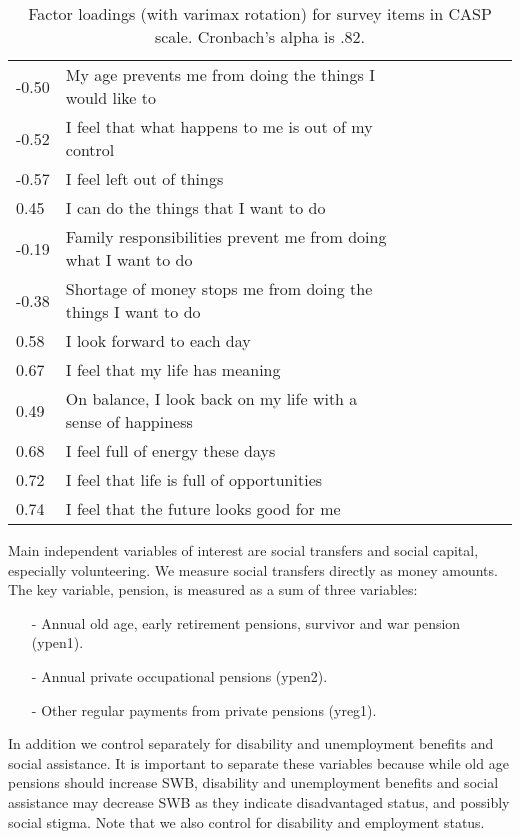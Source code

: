 \documentclass[10pt, letterpaper]{article}
\begin{document}
\begin{spacing}{1.4}
\begin{table}[h!]
  \centering
  \begin{tabular}{lllllllll} %
\hline
  -0.50& My age prevents me from doing the things I would like to\\
  -0.52& I feel that what happens to me is out of my control\\
  -0.57& I feel left out of things\\
   0.45& I can do the things that I want to do\\
  -0.19& Family responsibilities prevent me from doing what I want to do\\
  -0.38& Shortage of money stops me from doing the things I want to do\\
   0.58& I look forward to each day\\
   0.67& I feel that my life has meaning\\
   0.49& On balance, I look back on my life with a sense of happiness\\
   0.68& I feel full of energy these days\\
   0.72& I feel that life is full of opportunities\\
   0.74& I feel that the future looks good for me\\\hline
  \end{tabular}
  \caption{Factor loadings (with varimax rotation) for survey items in CASP scale. Cronbach's alpha is
    .82.}
  \label{casp}
\end{table}


Main independent variables of interest are social transfers and social capital,
especially volunteering. We  measure social transfers directly as money amounts. %
 The key variable, pension, is measured as a sum of three variables:
 \begin{spacing}{.9}
   \begin{itemize}
   \item[-] Annual old age, early retirement pensions, survivor and war pension
     (ypen1). %
   \item[-]  Annual private occupational pensions (ypen2). %
   \item[-] Other regular payments from private pensions (yreg1). %
   \end{itemize}
 \end{spacing}


In addition we control separately for disability and unemployment benefits and social
assistance. It is important to separate these variables because while old age
pensions should increase SWB, disability and unemployment benefits and social
assistance may decrease SWB as they indicate disadvantaged status, and possibly
social stigma. Note that we also control for disability and employment status. 


\end{spacing}
\end{document}

